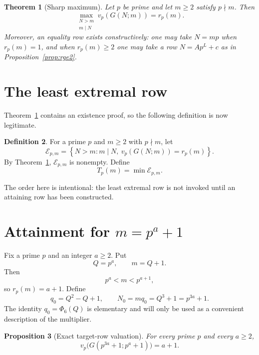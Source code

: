 \documentclass[11pt]{article}
\newtheorem{theorem}{Theorem}[section]
\newtheorem{proposition}[theorem]{Proposition}
\theoremstyle{definition}
\newtheorem{definition}[theorem]{Definition}
\theoremstyle{remark}
\begin{document}
\begin{theorem}[Sharp maximum]\label{thm:A}
Let $p$ be prime and let $m\ge2$ satisfy $p\nmid m$. Then
\[
  \max_{\substack{N>m\\m\mid N}}v_p(G(N;m))=r_p(m).
\]
Moreover, an equality row exists constructively: one may take $N=mp$ when $r_p(m)=1$, and when $r_p(m)\ge2$ one may take a row $N=A p^L+c$ as in Proposition~\ref{prop:rge2}.
\end{theorem}

\section{The least extremal row}\label{sec:Tdef}

Theorem~\ref{thm:A} contains an existence proof, so the following definition is now legitimate.

\begin{definition}\label{def:T}
For a prime $p$ and $m\ge2$ with $p\nmid m$, let
\[
  \mathcal E_{p,m}
  =\left\{N>m:m\mid N,\ v_p(G(N;m))=r_p(m)\right\}.
\]
By Theorem~\ref{thm:A}, $\mathcal E_{p,m}$ is nonempty. Define
\[
  T_p(m)=\min\mathcal E_{p,m}.
\]
\end{definition}

The order here is intentional: the least extremal row is not invoked until an attaining row has been constructed.

\section[Attainment for p-power plus one]{Attainment for $m=p^a+1$}\label{sec:Battain}

Fix a prime $p$ and an integer $a\ge2$. Put
\[
  Q=p^a,
  \qquad m=Q+1.
\]
Then
\[
  p^a<m<p^{a+1},
\]
so $r_p(m)=a+1$. Define
\[
  q_0=Q^2-Q+1,
  \qquad N_0=mq_0=Q^3+1=p^{3a}+1.
\]
The identity $q_0=\Phi_6(Q)$ is elementary and will only be used as a convenient description of the multiplier.

\begin{proposition}[Exact target-row valuation]\label{prop:Battain}
For every prime $p$ and every $a\ge2$,
\[
  v_p\bigl(G(p^{3a}+1;p^a+1)\bigr)=a+1.
\]
\end{proposition}
\end{document}

